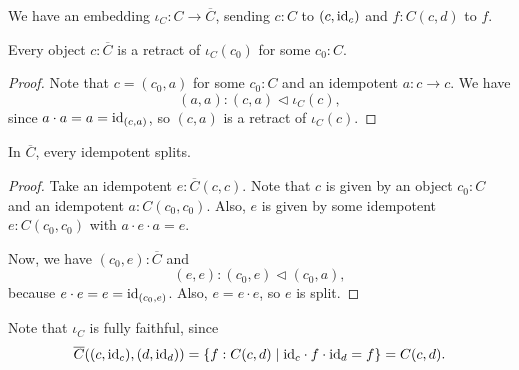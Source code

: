 \begin{definition}
  We have an embedding $ \iota_C: C \to \overline C $, sending $ c: C $ to $ (c, \text{id}_{c}) $ and $ f: C(c, d) $ to $ f $.
\end{definition}

\begin{lemma}\label{lem:karoubi-is-retract}
  Every object $ c: \overline C $ is a retract of $ \iota_C(c_0) $ for some $ c_0: C $.
\end{lemma}
\begin{proof}
  Note that $ c = (c_0, a) $ for some $ c_0: C $ and an idempotent $ a: c \to c $. We have
  \[ (a, a) : (c, a) \triangleleft \iota_C(c), \]
  since $ a \cdot a = a = \text{id}_{(c, a)} $, so $ (c, a) $ is a retract of $ \iota_C(c) $.
\end{proof}

\begin{lemma}
  In $ \overline C $, every idempotent splits.
\end{lemma}
\begin{proof}
  Take an idempotent $ e: \overline C(c, c) $. Note that $ c $ is given by an object $ c_0: C $ and an idempotent $ a: C(c_0, c_0) $. Also, $ e $ is given by some idempotent $ e: C(c_0, c_0) $ with $ a \cdot e \cdot a = e $.

  Now, we have $ (c_0, e): \overline C $ and
  \[ (e, e) : (c_0, e) \triangleleft (c_0, a), \]
  because $ e \cdot e = e = \text{id}_{(c_0, e)} $. Also, $ e = e \cdot e $, so $ e $ is split.
\end{proof}

\begin{remark}
  Note that $ \iota_C $ is fully faithful, since
  \[ \overline C((c, \text{id}_{c}), (d, \text{id}_{d})) = \{ f: C(c, d) \mid \text{id}_{c} \cdot f \cdot \text{id}_{d} = f \} = C(c, d). \]
\end{remark}

